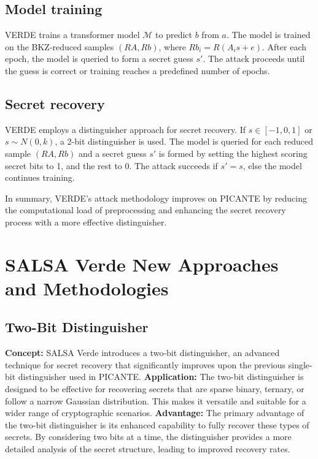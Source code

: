 \documentclass{article}
\begin{document}
\subsection{Model training}
VERDE trains a transformer model $\mathcal{M}$ to predict $b$ from $a$. The model is trained on the BKZ-reduced samples $(RA, Rb)$, where $Rb_i = R(A_i s + e)$. After each epoch, the model is queried to form a secret guess $s'$. The attack proceeds until the guess is correct or training reaches a predefined number of epochs. 

\subsection{Secret recovery}
VERDE employs a distinguisher approach for secret recovery. If $s \in [-1, 0, 1]$ or $s \sim N(0, k)$, a 2-bit distinguisher is used. The model is queried for each reduced sample $(RA, Rb)$ and a secret guess $s'$ is formed by setting the highest scoring secret bits to 1, and the rest to 0. The attack succeeds if $s' = s$, else the model continues training.

In summary, VERDE's attack methodology improves on PICANTE by reducing the computational load of preprocessing and enhancing the secret recovery process with a more effective distinguisher.

\section{SALSA Verde New Approaches and Methodologies}

\subsection{Two-Bit Distinguisher}

\textbf{Concept:} SALSA Verde introduces a two-bit distinguisher, an advanced technique for secret recovery that significantly improves upon the previous single-bit distinguisher used in PICANTE.
\textbf{Application:} The two-bit distinguisher is designed to be effective for recovering secrets that are sparse binary, ternary, or follow a narrow Gaussian distribution. This makes it versatile and suitable for a wider range of cryptographic scenarios.
\textbf{Advantage:} The primary advantage of the two-bit distinguisher is its enhanced capability to fully recover these types of secrets. By considering two bits at a time, the distinguisher provides a more detailed analysis of the secret structure, leading to improved recovery rates.
\end{document}
